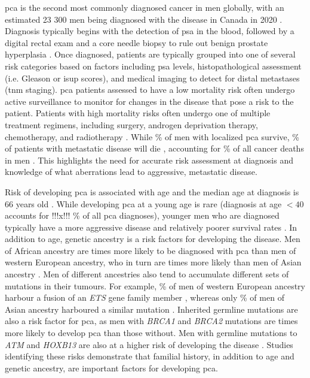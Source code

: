 \Gls{pca} is the second most commonly diagnosed cancer in men globally, with an estimated 23 300 men being diagnosed with the disease in Canada in 2020 \cite{brayGlobalCancerStatistics2018,brennerProjectedEstimatesCancer2020}.
Diagnosis typically begins with the detection of \gls{psa} in the blood, followed by a digital rectal exam and a core needle biopsy to rule out benign prostate hyperplasia \cite{}.
Once diagnosed, patients are typically grouped into one of several risk categories based on factors including \gls{psa} levels, histopathological assessment (i.e. Gleason or \gls{isup} scores), and medical imaging to detect for distal metastases (\gls{tnm} staging)\cite{}.
\Gls{pca} patients assessed to have a low mortality risk often undergo active surveillance to monitor for changes in the disease that pose a risk to the patient.
Patients with high mortality risks often undergo one of multiple treatment regimens, including surgery, androgen deprivation therapy, chemotherapy, and radiotherapy \cite{}.
While  \% of men with localized \gls{pca} survive,  \% of patients with metastatic disease will die \cite{}, accounting for  \% of all cancer deaths in men \cite{brennerProjectedEstimatesCancer2020}.
This highlights the need for accurate risk assessment at diagnosis and knowledge of what aberrations lead to aggressive, metastatic disease.

Risk of developing \gls{pca} is associated with age and the median age at diagnosis is 66 years old \cite{}.
While developing \gls{pca} at a young age is rare (diagnosis at age $< 40$ accounts for !!!x!!! \% of all \gls{pca} diagnoses), younger men who are diagnosed typically have a more aggressive disease and relatively poorer survival rates \cite{}.
In addition to age, genetic ancestry is a risk factors for developing the disease.
Men of African ancestry are  times more likely to be diagnosed with \gls{pca} than men of western European ancestry, who in turn are  times more likely than men of Asian ancestry \cite{}.
Men of different ancestries also tend to accumulate different sets of mutations in their tumours.
For example,  \% of men of western European ancestry harbour a fusion of an \emph{ETS} gene family member \cite{fraserGenomicHallmarksLocalized2017}, whereas only  \% of men of Asian ancestry harboured a similar mutation \cite{liGenomicEpigenomicAtlas2020}.
Inherited germline mutations are also a risk factor for \gls{pca}, as men with \emph{BRCA1} and \emph{BRCA2} mutations are  times more likely to develop \gls{pca} than those without.
Men with germline mutations to \emph{ATM} and \emph{HOXB13} are also at a higher risk of developing the disease \cite{}.
Studies identifying these risks demonstrate that familial history, in addition to age and genetic ancestry, are important factors for developing \gls{pca}.

